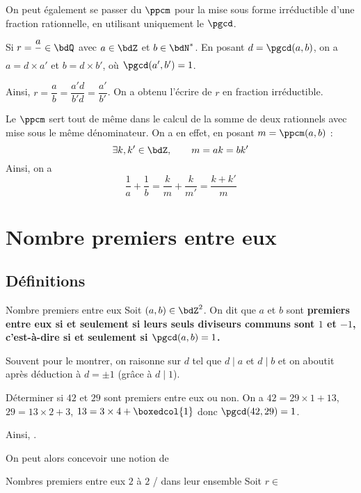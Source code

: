 \documentclass[a4paper,french,bookmarks]{article}
\begin{document}
On peut également se passer du $\ppcm$ pour la mise sous forme irréductible d'une fraction rationnelle, en utilisant uniquement le $\pgcd$.

Si $r = \dfrac{a}{} \in \bdQ$ avec $a \in \bdZ$ et $b \in \bdN^*$. En posant $d = \pgcd(a, b)$, on a $a = d\times a'$ et $b = d\times b'$, où $\pgcd(a', b') = 1$.

Ainsi, $r = \dfrac{a}{b}=\dfrac{a'd}{b'd}=\dfrac{a'}{b'}$. On a obtenu l'écrire de $r$ en fraction irréductible.

Le $\ppcm$ sert tout de même dans le calcul de la somme de deux rationnels avec mise sous le même dénominateur. On a en effet, en posant $m = \ppcm(a, b)$ :
\[ \exists k, k' \in \bdZ,\qquad m = ak = bk'\]
Ainsi, on a 
\[  \dfrac{1}{a} + \dfrac{1}{b} = \dfrac{k}{m} + \dfrac{k}{m'} = \dfrac{k+k'}{m}\]

\section{Nombre premiers entre eux}

\subsection{Définitions}

\begin{definition}{Nombre premiers entre eux}{}
    Soit $(a, b) \in \bdZ^2$. On dit que $a$ et $b$ sont \bf{premiers entre eux} si et seulement si leurs seuls diviseurs communs sont $1$ et $-1$, c'est-à-dire si et seulement si $\pgcd(a, b) = 1$.
\end{definition}

Souvent pour le montrer, on raisonne sur $d$ tel que $d \mid a$ et $d \mid b$ et on aboutit après déduction à $d = \pm 1$ (grâce à $d \mid 1$).

\begin{example}{}{}
    Déterminer si $42$ et $29$ sont premiers entre eux ou non.
    \tcblower
    On a $42 = 29 \times 1 + 13$, $29 = 13\times 2 + 3$, $13 = 3\times 4 + \boxedcol{1}$ donc $\pgcd(42, 29) = 1$.
    
    Ainsi, .
\end{example}

On peut alors concevoir une notion de  

\begin{definition}{Nombres premiers entre eux $2$ à $2$ / dans leur ensemble}{}
    Soit $r \in $
\end{definition}
\end{document}
